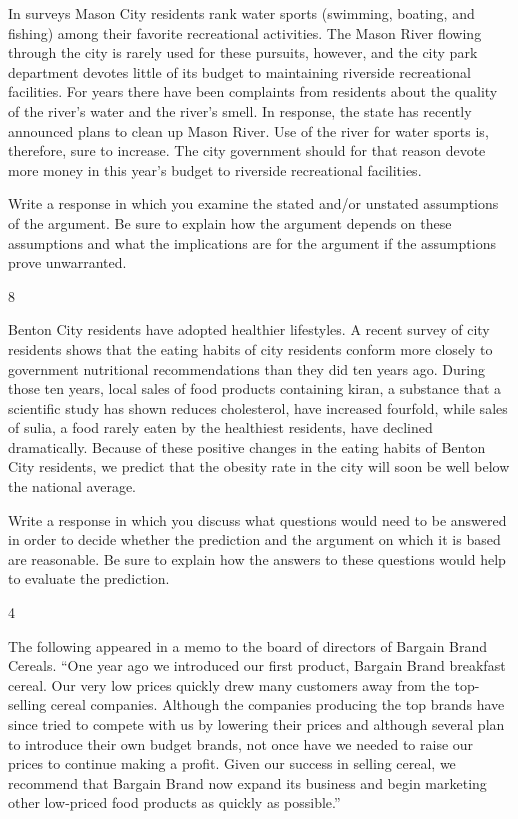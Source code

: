 \documentclass[]{article}
\begin{document}
In surveys Mason City residents rank water sports (swimming, boating,
and fishing) among their favorite recreational activities. The Mason
River flowing through the city is rarely used for these pursuits,
however, and the city park department devotes little of its budget to
maintaining riverside recreational facilities. For years there have been
complaints from residents about the quality of the river's water and the
river's smell. In response, the state has recently announced plans to
clean up Mason River. Use of the river for water sports is, therefore,
sure to increase. The city government should for that reason devote more
money in this year's budget to riverside recreational facilities.

Write a response in which you examine the stated and/or unstated
assumptions of the argument. Be sure to explain how the argument depends
on these assumptions and what the implications are for the argument if
the assumptions prove unwarranted.

8

Benton City residents have adopted healthier lifestyles. A recent survey
of city residents shows that the eating habits of city residents conform
more closely to government nutritional recommendations than they did ten
years ago. During those ten years, local sales of food products
containing kiran, a substance that a scientific study has shown reduces
cholesterol, have increased fourfold, while sales of sulia, a food
rarely eaten by the healthiest residents, have declined dramatically.
Because of these positive changes in the eating habits of Benton City
residents, we predict that the obesity rate in the city will soon be
well below the national average.

Write a response in which you discuss what questions would need to be
answered in order to decide whether the prediction and the argument on
which it is based are reasonable. Be sure to explain how the answers to
these questions would help to evaluate the prediction.

4

The following appeared in a memo to the board of directors of Bargain
Brand Cereals. ``One year ago we introduced our first product, Bargain
Brand breakfast cereal. Our very low prices quickly drew many customers
away from the top-selling cereal companies. Although the companies
producing the top brands have since tried to compete with us by lowering
their prices and although several plan to introduce their own budget
brands, not once have we needed to raise our prices to continue making a
profit. Given our success in selling cereal, we recommend that Bargain
Brand now expand its business and begin marketing other low-priced food
products as quickly as possible.''
\end{document}
